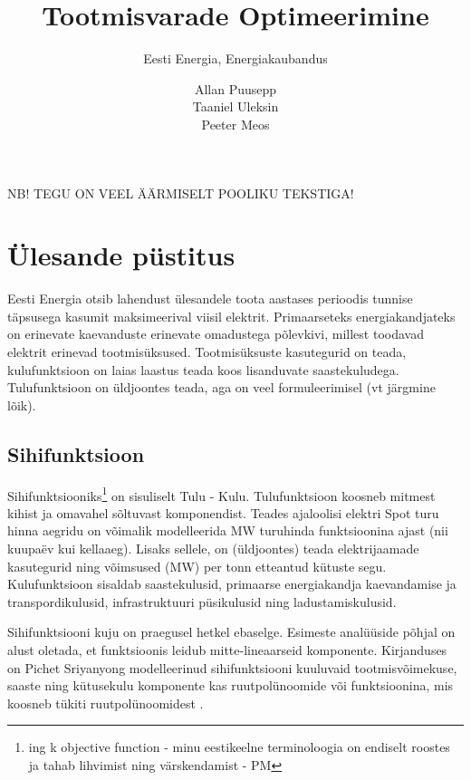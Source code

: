 \documentclass[twosided, 10pt, a4paper]{article}
\title{Tootmisvarade Optimeerimine}
\subtitle{Eesti Energia, Energiakaubandus}
\author{Allan Puusepp \\ Taaniel Uleksin \\ Peeter Meos }
\begin{document}
\maketitle

NB! TEGU ON VEEL \"A\"ARMISELT POOLIKU TEKSTIGA!

\section{\"Ulesande p\"ustitus}
Eesti Energia otsib  lahendust \"ulesandele toota aastases perioodis tunnise t\"apsuse\-ga kasumit maksimeerival viisil elektrit. Primaarseteks energiakandjateks on erinevate kaevanduste erinevate omadustega p\~olevkivi, millest toodavad elektrit erinevad  tootmis\"uksused. Tootmis\"uksuste kasutegurid on teada, kulufunktsioon on laias laastus teada koos lisanduvate saastekuludega. Tulufunktsioon on \"uldjoontes teada, aga on veel formuleerimisel (vt j\"argmine l\~oik).

\subsection{Sihifunktsioon}
Sihifunktsiooniks\footnote{ing k objective function - minu eestikeelne terminoloogia on endiselt roostes ja tahab lihvimist ning v\"arskendamist - PM} on sisuliselt Tulu - Kulu. Tulufunktsioon koosneb mitmest kihist ja omavahel s\~oltuvast komponendist. Teades ajaloolisi elektri Spot turu hinna aegridu on v\~oimalik modelleerida MW turuhinda funktsioonina ajast (nii kuupa\"ev kui kellaaeg). Lisaks sellele, on (\"uldjoontes) teada elektrijaamade kasutegurid ning v\~oimsused (MW) per tonn etteantud k\"utuste segu. Kulufunktsioon sisaldab saastekulusid, primaarse energiakandja kaevandamise ja transpordikulusid, infrastruktuuri p\"usikulusid ning ladustamiskulusid.

Sihifunktsiooni kuju on praegusel hetkel ebaselge. Esimeste anal\"u\"uside p\~ohjal on alust oletada, et funktsioonis leidub mitte-lineaarseid komponente. Kirjanduses on Pichet Sriyanyong modelleerinud sihifunktsiooni kuuluvaid toot\-mis\-v\~oi\-me\-ku\-se, saaste ning k\"utusekulu komponente kas ruutpol\"unoomide v\~oi funktsioonina, mis koosneb t\"ukiti ruutpol\"unoomidest \cite{sriyanyong}.
\end{document}
